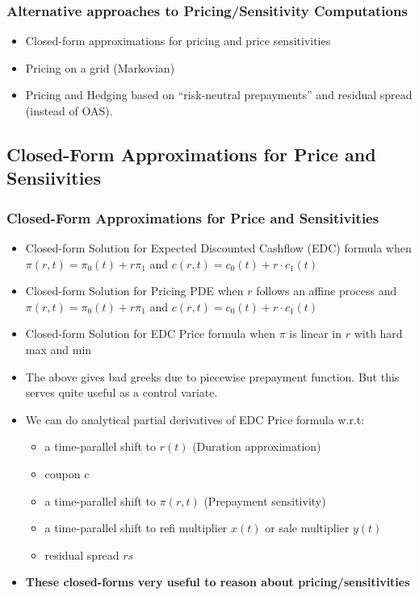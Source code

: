 \documentclass{beamer}
\begin{document}
\begin{frame}
\frametitle{Alternative approaches to Pricing/Sensitivity Computations}
\begin{itemize}
\item Closed-form approximations for pricing and price sensitivities
\item Pricing on a grid (Markovian)
\item Pricing and Hedging based on ``risk-neutral prepayments'' and residual spread (instead of OAS).
\end{itemize}
\end{frame}

\subsection{Closed-Form Approximations for Price and Sensiivities}

\begin{frame}
\frametitle{Closed-Form Approximations for Price and Sensitivities}
\begin{itemize}
\item Closed-form Solution for Expected Discounted Cashflow (EDC) formula when $\pi(r,t) = \pi_0(t) + r \pi_1$ and $c(r,t) = c_0(t) + r \cdot c_1(t)$
\item Closed-form Solution for Pricing PDE when $r$ follows an affine process and $\pi(r,t) = \pi_0(t) + r \pi_1$ and $c(r,t) = c_0(t) + r \cdot c_1(t)$
\item Closed-form Solution for EDC Price formula when $\pi$ is linear in $r$ with hard max and min
\item The above gives bad greeks due to piecewise prepayment function. But this serves quite useful as a control variate.
\item We can do analytical partial derivatives of EDC Price formula w.r.t:
\begin{itemize}
\item a time-parallel shift to $r(t)$ (Duration approximation)
\item coupon $c$
\item a time-parallel shift to $\pi(r,t)$ (Prepayment sensitivity)
\item a time-parallel shift to refi multiplier $x(t)$ or sale multiplier $y(t)$
\item residual spread $rs$
\end{itemize}
\item {\bf These closed-forms very useful to reason about pricing/sensitivities}
\end{itemize}
\end{frame}
\end{document}
